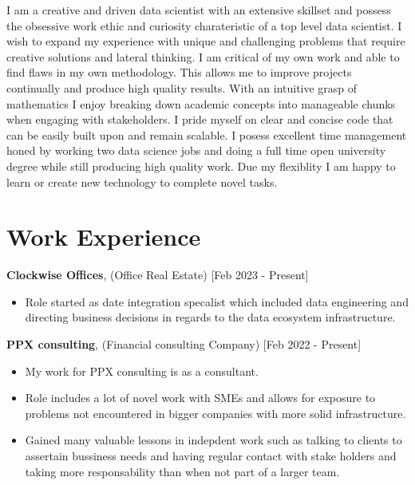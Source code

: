 \documentclass[10pt]{article}
\begin{document}
{I am a creative and driven data scientist with an extensive skillset and possess the obsessive work ethic and curiosity charateristic of a top level data scientist.
I wish to expand my experience with unique and challenging problems that require creative solutions
and lateral thinking.
\newline
I am critical of my own work and able to find flaws in my own methodology. This allows me to
improve projects continually and produce high quality results.
With an intuitive grasp of mathematics I enjoy breaking down academic concepts into manageable chunks when engaging with stakeholders.
\newline
I pride myself on clear and concise code that can be easily built upon and remain scalable.
\newline
I posess excellent time management honed by working two data science jobs and doing a full time open
university degree while still producing high quality work.
Due my flexiblity I am happy to learn or create new technology to complete novel tasks.





\section*{\bf Work Experience}

{\bf Clockwise Offices}, (Office Real Estate) [Feb 2023 - Present]
\begin{itemize}
\setlength{\itemsep}{0.10ex}
\item Role started as date integration specalist which included data engineering and directing business decisions in regards to the data ecosystem infrastructure.

\end{itemize}

{\bf PPX consulting}, (Financial consulting Company) [Feb 2022 - Present]
\begin{itemize}
\setlength{\itemsep}{0.10ex}
\item My work for PPX consulting is as a consultant.
\item Role includes a lot of novel work with SMEs and allows for exposure to problems not encountered in bigger companies with more solid infrastructure.
\item Gained many valuable lessons in indepdent work such as talking to clients to assertain
bussiness needs and having regular contact with stake holders and taking more responsability than when not part of a larger team.


\end{itemize}}
\end{document}
